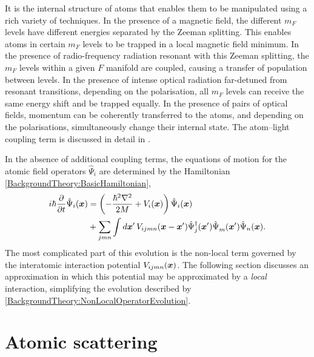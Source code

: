 It is the internal structure of atoms that enables them to be manipulated using a rich variety of techniques.  In the presence of a magnetic field, the different $m_F$ levels have different energies separated by the Zeeman splitting.  This enables atoms in certain $m_F$ levels to be trapped in a local magnetic field minimum.  In the presence of radio-frequency radiation resonant with this Zeeman splitting, the $m_F$ levels within a given $F$ manifold are coupled, causing a transfer of population between levels.  In the presence of intense optical radiation far-detuned from resonant transitions, depending on the polarisation, all $m_F$ levels can receive the same energy shift and be trapped equally.  In the presence of pairs of optical fields, momentum can be coherently transferred to the atoms, and depending on the polarisations, simultaneously change their internal state.  The atom--light coupling term is discussed in detail in .

In the absence of additional coupling terms, the equations of motion for the atomic field operators $\hat{\Psi}_i$ are determined by the Hamiltonian \eqref{BackgroundTheory:BasicHamiltonian},
\begin{align}
    \begin{split}
    i \hbar \frac{\partial}{\partial t}\hat{\Psi}_i(\vect{x}) &= \left( - \frac{\hbar^2 \nabla^2}{2 M}  + V_i(\vect{x}) \right) \hat{\Psi}_i(\vect{x}) \\
        &+ \sum_{jmn} \int d \vect{x}'\, V_{ijmn}(\vect{x} - \vect{x}') \hat{\Psi}_j^\dagger(\vect{x}') \hat{\Psi}_m^{\phantom{\dagger}}(\vect{x}') \hat{\Psi}_n(\vect{x}).
    \end{split}\label{BackgroundTheory:NonLocalOperatorEvolution}
\end{align}
The most complicated part of this evolution is the non-local term governed by the interatomic interaction potential $V_{ijmn}(\bm{x})$.  The following section discusses an approximation in which this potential may be approximated by a \emph{local} interaction, simplifying the evolution described by \eqref{BackgroundTheory:NonLocalOperatorEvolution}.

\section{Atomic scattering}
\label{BackgroundTheory:AtomicScattering}

